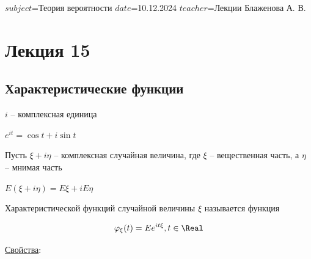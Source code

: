 $subject$=Теория вероятности
$date$=10.12.2024
$teacher$=Лекции Блаженова А. В.

\section{Лекция 15}

\subsection{Характеристические функции}

\Mem $i$ -- комплексная единица

\Mems $e^{it} = \cos t + i \sin t$

Пусть $\xi + i\eta$ -- комплексная случайная величина, где $\xi$ -- вещественная часть, а $\eta$ -- мнимая часть

\Def $E(\xi + i\eta) = E\xi + iE\eta$

\hypertarget{characteristicfunction}{}

\Def Характеристической функций случайной величины $\xi$ называется функция 

\[\varphi_\xi(t) = Ee^{it\xi}, t \in \Real\]

\underline{Свойства}:

